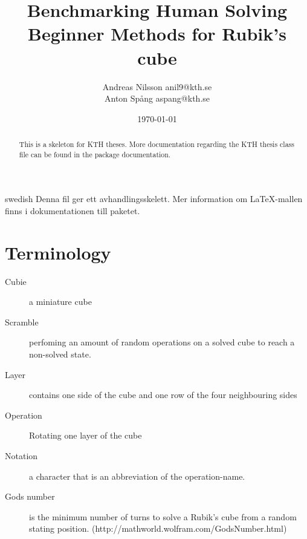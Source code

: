 \documentclass[a4paper,11pt]{kth-mag}
\title{Benchmarking Human Solving Beginner Methods for
           Rubik's cube}
\author{Andreas Nilsson  anil9@kth.se\\Anton Spång  aspang@kth.se}
\date{\today}
\begin{document}
\frontmatter
\pagestyle{empty}
\removepagenumbers
\maketitle
{}
\begin{abstract}
  This is a skeleton for KTH theses. More documentation
  regarding the KTH thesis class file can be found in
  the package documentation.


\end{abstract}
\clearpage
\begin{foreignabstract}{swedish}
  Denna fil ger ett avhandlingsskelett.
  Mer information om \LaTeX-mallen finns i
  dokumentationen till paketet.
\end{foreignabstract}

\clearpage
\tableofcontents*
\mainmatter
\section{Terminology} 
	\begin{description}
		\item[Cubie] a miniature cube
		\item[Scramble] perfoming an amount of random operations on a solved cube to reach a non-solved state.
		\item[Layer] contains one side of the cube and one row of the four neighbouring sides 
		\item[Operation] Rotating one layer of the cube
		\item[Notation] a character that is an abbreviation of the operation-name.
		\item[Gods number] is the minimum number of turns to solve a Rubik's cube from a random stating position. (http://mathworld.wolfram.com/GodsNumber.html)
	\end{description}

\pagestyle{newchap}
\end{document}
